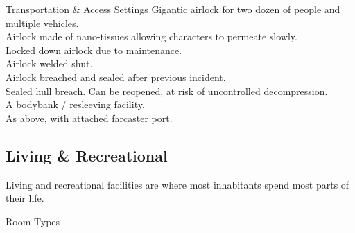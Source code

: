 \begin{tableone}{Transportation \& Access Settings}
Gigantic airlock for two dozen of people and multiple vehicles.\\
Airlock made of nano-tissues allowing characters to permeate slowly.\\
Locked down airlock due to maintenance.\\
Airlock welded shut.\\
Airlock breached and sealed after previous incident.\\
Sealed hull breach. Can be reopened, at risk of uncontrolled decompression.\\
A bodybank / resleeving facility.\\
As above, with attached farcaster port.\\
\end{tableone}



\begin{multicols}{2}


\subsection*{Living \& Recreational}

Living and recreational facilities are where most inhabitants spend most parts of their life.

Room Types

\end{multicols}



